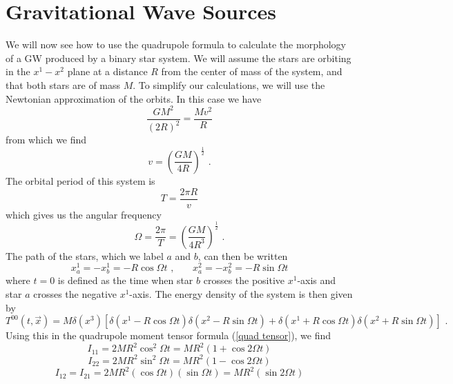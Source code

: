 \documentclass[11pt]{cuthesis}
\newcommand{\fs}{\text{ .}}
\begin{document}
\section{Gravitational Wave Sources}
We will now see how to use the quadrupole formula to calculate the morphology of a GW produced by a binary star system. We will assume the stars are orbiting in the $x^1-x^2$ plane at a distance $R$ from the center of mass of the system, and that both stars are of mass $M$. To simplify our calculations, we will use the Newtonian approximation of the orbits. In this case we have 
\begin{equation}
\frac{GM^2}{(2R)^2} = \frac{Mv^2}{R}
\end{equation}
from which we find
\begin{equation}
v=\left( \frac{GM}{4R} \right)^\frac{1}{2} \fs
\end{equation}
The orbital period of this system is
\begin{equation}
T=\frac{2\pi R}{v}
\end{equation}
which gives us the angular frequency
\begin{equation}
\Omega = \frac{2\pi}{T} = \left(\frac{GM}{4R^3}\right)^\frac{1}{2} \fs
\end{equation}
The path of the stars, which we label $a$ and $b$, can then be written 
\begin{equation}
x_a^1 = -x_b^1 = -R\cos \Omega t \text{  ,  } \hspace{20pt} x_a^2 = -x_b^2 = -R\sin \Omega t 
\end{equation}
where $t=0$ is defined as the time when star $b$ crosses the positive $x^1$-axis and star $a$ crosses the negative $x^1$-axis.
The energy density of the system is then given by
\begin{equation}
T^{00}(t,\vec{x}) = M \delta(x^3) [ \delta(x^1 - R\cos\Omega t ) \delta( x^2 - R\sin \Omega t ) +  \delta(x^1 + R\cos\Omega t ) \delta( x^2 + R\sin \Omega t ) ] \fs
\end{equation}
Using this in the quadrupole moment tensor formula (\ref{quad tensor}), we find
\begin{equation}
I_{11} = 2MR^2 \cos^2 \Omega t = MR^2 (1+\cos 2\Omega t)
\end{equation}
\begin{equation}
I_{22} = 2MR^2 \sin^2 \Omega t = MR^2 (1-\cos 2\Omega t)
\end{equation}
\begin{equation}
I_{12} = I_{21} = 2MR^2 (\cos \Omega t)(\sin \Omega t) = MR^2 (\sin 2\Omega t)
\end{equation}
\end{document}
